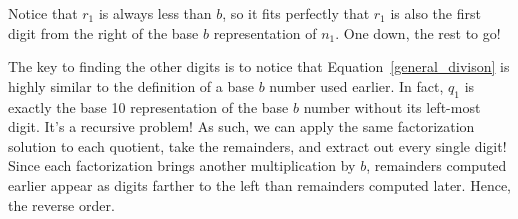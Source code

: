 \documentclass[12pt]{article}
\begin{document}
Notice that $r_1$ is always less than $b$, so it fits perfectly that $r_1$ is also the first digit from
 the right of the base $b$ representation of $n_1$.  
One down, the rest to go!

The key to finding the other digits is to notice that Equation~\ref{general_divison} is highly similar
to the definition of a base $b$ number used earlier. 
In fact, $q_1$ is exactly the base 10 representation of the base $b$ number without its left-most digit.
It's a recursive problem!
As such, we can apply the same factorization solution to each quotient, take the remainders, and extract out every single digit! 
Since each factorization brings another multiplication by $b$, remainders computed earlier appear as
digits farther to the left than remainders computed later. Hence, the reverse order.
\end{document}
